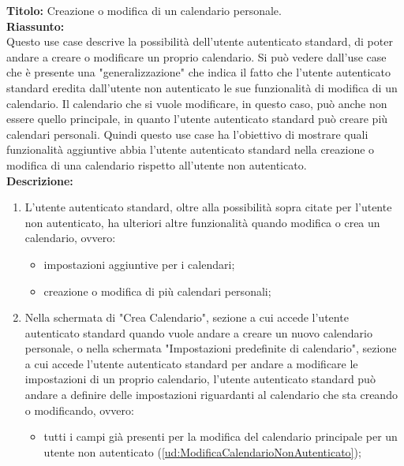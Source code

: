 \begin{listaPersonale}[UC]{}
\begin{listaPersonale2}[UC] {}
        \textbf{Titolo: } Creazione o modifica di un calendario personale. \\
        \textbf{Riassunto: } \\  Questo use case descrive la possibilità dell'utente autenticato standard, di poter andare a creare o modificare un proprio calendario. Si può vedere dall'use case che è presente una "generalizzazione" che indica il fatto che l'utente autenticato standard eredita dall'utente non autenticato le sue funzionalità di modifica di un calendario. Il calendario che si vuole modificare, in questo caso, può anche non essere quello principale, in quanto l'utente autenticato standard può creare più calendari personali. Quindi questo use case ha l'obiettivo di mostrare quali funzionalità aggiuntive abbia l'utente autenticato standard nella creazione o modifica di una calendario rispetto all'utente non autenticato. \\ 
        \textbf{Descrizione: } 
        \begin{enumerate}
            \item L'utente autenticato standard, oltre alla possibilità sopra citate per l'utente non autenticato, ha ulteriori altre funzionalità quando modifica o crea un calendario, ovvero:
            \begin{itemize}
                \item impostazioni aggiuntive per i calendari;
                \item creazione o modifica di più calendari personali;
            \end{itemize}
            \item Nella schermata di "Crea Calendario", sezione a cui accede l'utente autenticato standard quando vuole andare a creare un nuovo calendario personale, o nella schermata "Impostazioni predefinite di calendario", sezione a cui accede l'utente autenticato standard per andare a modificare le impostazioni di un proprio calendario, l'utente autenticato standard può andare a definire delle impostazioni riguardanti al calendario che sta creando o modificando, ovvero:
                \begin{itemize}
                    \item tutti i campi già presenti per la modifica del calendario principale per un utente non autenticato (\ref{ud:ModificaCalendarioNonAutenticato});

\end{itemize}
\end{enumerate}
\end{listaPersonale2}
\end{listaPersonale}
